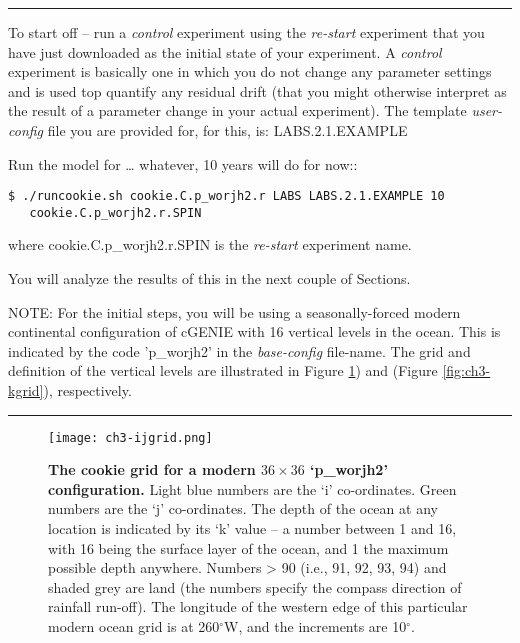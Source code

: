 \vspace{1mm}\noindent\rule{4cm}{0.5pt}\vspace{2mm}

\noindent To start off -- run a \textit{control} experiment using the \textit{re-start} experiment that you have just downloaded as the initial state of your experiment. A \textit{control} experiment is basically one in which you do not change any parameter settings and is used top quantify any residual drift (that you might otherwise interpret as the result of a parameter change in your actual experiment). The template \textit{user-config} file you are provided for, for this, is: \textsf{\footnotesize LABS.2.1.EXAMPLE}

\vspace{1mm}
Run the model for … whatever, 10 years will do for now::

\vspace{-2mm}\small\begin{verbatim}
$ ./runcookie.sh cookie.C.p_worjh2.r LABS LABS.2.1.EXAMPLE 10 
   cookie.C.p_worjh2.r.SPIN
\end{verbatim}\normalsize\vspace{-2mm}
where \textsf{\footnotesize cookie.C.p\_worjh2.r.SPIN} is the \textit{re-start} experiment name.

\vspace{1mm}
You will analyze the results of this in the next couple of Sections.

\vspace{1mm}
\noindent NOTE: For the initial steps, you will be using a seasonally-forced modern continental configuration of cGENIE with 16 vertical levels in the ocean. This is indicated by the code '\textsf{\footnotesize p\_worjh2}' in the \textit{base-config} file-name. The grid and definition of the vertical levels are illustrated in Figure \ref{fig:ch3-ijgrid}) and (Figure \ref{fig:ch3-kgrid}), respectively.

\vspace{1mm}\noindent\rule{4cm}{0.5pt}\vspace{2mm}

\begin{figure}
\texttt{[image: ch3-ijgrid.png]}\centering
\vspace{2mm}
\caption{
\textbf{The \textbf{cookie} grid for a modern \(36\times36\) ‘p\_worjh2’ configuration.} Light blue numbers are the ‘i’ co-ordinates. Green numbers are the ‘j’ co-ordinates.
The depth of the ocean at any location is indicated by its ‘k’ value – a number between 1 and 16, with 16 being the surface layer of the ocean, and 1 the maximum possible depth anywhere.
Numbers > 90 (i.e., 91, 92, 93, 94) and shaded grey are land (the numbers specify the compass direction of rainfall run-off). The longitude of the western edge of this particular modern ocean grid is at 260$^{\circ}$W, and the increments are 10$^{\circ}$.
}
\label{fig:ch3-ijgrid}
\end{figure}

